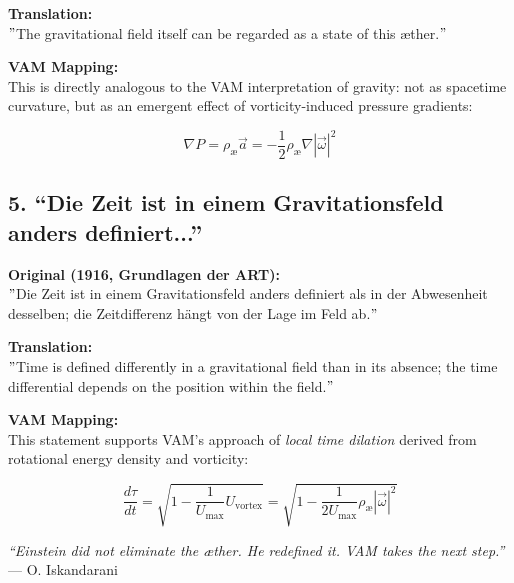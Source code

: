     \textbf{Translation:} \\
    \("\)The gravitational field itself can be regarded as a state of this æther.\("\)

    \textbf{VAM Mapping:} \\
    This is directly analogous to the VAM interpretation of gravity: not as spacetime curvature, but as an emergent effect of vorticity-induced pressure gradients:

    \[
    \nabla P = \rho_\text{\ae} \vec{a} = -\frac{1}{2} \rho_\text{\ae} \nabla |\vec{\omega}|^2
    \]

    \subsection*{5. “Die Zeit ist in einem Gravitationsfeld anders definiert...”}
    \textbf{Original (1916, Grundlagen der ART):} \\
    \("\)Die Zeit ist in einem Gravitationsfeld anders definiert als in der Abwesenheit desselben; die Zeitdifferenz hängt von der Lage im Feld ab.\("\)

    \textbf{Translation:} \\
    \("\)Time is defined differently in a gravitational field than in its absence; the time differential depends on the position within the field.\("\)

    \textbf{VAM Mapping:} \\
    This statement supports VAM's approach of \emph{local time dilation} derived from rotational energy density and vorticity:

    \[
    \frac{d\tau}{dt} = \sqrt{1 - \frac{1}{U_\text{max}} U_{\text{vortex}}} = \sqrt{1 - \frac{1}{2U_\text{max}} \rho_\text{\ae} |\vec{\omega}|^2}
    \]

    \bigskip
    \textit{“Einstein did not eliminate the æther. He redefined it. VAM takes the next step.”} — O. Iskandarani